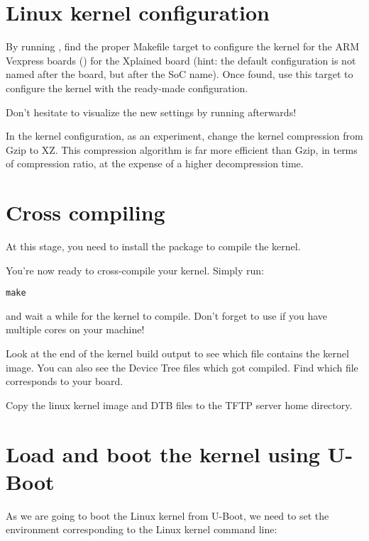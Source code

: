 \section{Linux kernel configuration}

By running , find the proper Makefile target to
configure the kernel
{for the ARM Vexpress boards ()}
{for the Xplained board (hint: the default
configuration is not named after the board, but after the SoC
name). Once found, use this target to configure the kernel with the
ready-made configuration.}

Don't hesitate to visualize the new settings by running
 afterwards!

In the kernel configuration, as an experiment, change the kernel
compression from Gzip to XZ. This compression algorithm is far more
efficient than Gzip, in terms of compression ratio, at the expense of
a higher decompression time.

\section{Cross compiling}

At this stage, you need to install the 
package to compile the kernel.

You're now ready to cross-compile your kernel. Simply run:

\begin{verbatim}
make
\end{verbatim}

and wait a while for the kernel to compile. Don't forget to use
 if you have multiple cores on your machine!

Look at the end of the kernel build output to see which file contains
the kernel image. You can also see the Device Tree  files
which got compiled. Find which  file corresponds to your
board.

Copy the linux kernel image and DTB files to the TFTP server
home directory.

\section{Load and boot the kernel using U-Boot}

As we are going to boot the Linux kernel from U-Boot,
we need to set the  environment corresponding
to the Linux kernel command line:

